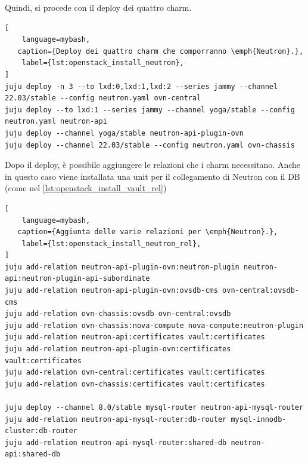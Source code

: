 \bigskip\noindent
Quindi, si procede con il deploy dei quattro charm.
\begin{lstlisting}[
    language=mybash, 
   caption={Deploy dei quattro charm che comporranno \emph{Neutron}.},
    label={lst:openstack_install_neutron},
]
juju deploy -n 3 --to lxd:0,lxd:1,lxd:2 --series jammy --channel 22.03/stable --config neutron.yaml ovn-central
juju deploy --to lxd:1 --series jammy --channel yoga/stable --config neutron.yaml neutron-api
juju deploy --channel yoga/stable neutron-api-plugin-ovn
juju deploy --channel 22.03/stable --config neutron.yaml ovn-chassis
\end{lstlisting}

\bigskip\noindent
Dopo il deploy, è possibile aggiungere le relazioni che i charm necessitano.
% 
Anche in questo caso viene installata una unit per il collegamento di Neutron con il DB (come nel \cref{lst:openstack_install_vault_rel})
\begin{lstlisting}[
    language=mybash, 
   caption={Aggiunta delle varie relazioni per \emph{Neutron}.},
    label={lst:openstack_install_neutron_rel},
]
juju add-relation neutron-api-plugin-ovn:neutron-plugin neutron-api:neutron-plugin-api-subordinate
juju add-relation neutron-api-plugin-ovn:ovsdb-cms ovn-central:ovsdb-cms
juju add-relation ovn-chassis:ovsdb ovn-central:ovsdb
juju add-relation ovn-chassis:nova-compute nova-compute:neutron-plugin
juju add-relation neutron-api:certificates vault:certificates
juju add-relation neutron-api-plugin-ovn:certificates vault:certificates
juju add-relation ovn-central:certificates vault:certificates
juju add-relation ovn-chassis:certificates vault:certificates

juju deploy --channel 8.0/stable mysql-router neutron-api-mysql-router
juju add-relation neutron-api-mysql-router:db-router mysql-innodb-cluster:db-router
juju add-relation neutron-api-mysql-router:shared-db neutron-api:shared-db
\end{lstlisting}



